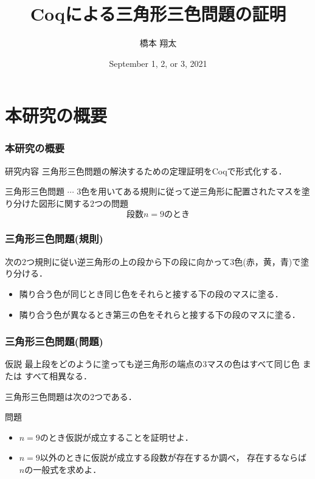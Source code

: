 \documentclass[dvipdfmx,cjk]{beamer}
\begin{document}
\title[Coqによる三角形三色問題の証明]{Coqによる三角形三色問題の証明} 
\author[Syota Hashimoto]{橋本 翔太}
\date{September 1, 2, or 3, 2021}

\begin{frame}
  \titlepage
\end{frame}

\begin{frame}
\tableofcontents
\end{frame}

\section{本研究の概要}

\begin{frame}
  \frametitle{本研究の概要}
  \begin{block}{研究内容}
    三角形三色問題の解決するための定理証明をCoqで形式化する．
  \end{block}

  \vspace{10pt}
  三角形三色問題 $\cdots$ $3$色を用いてある規則に従って逆三角形に配置されたマスを塗り分けた図形に関する$2$つの問題
  \[
  
  \text{段数}n=9\text{のとき}
  \]
\end{frame}

\begin{frame}
  \frametitle{三角形三色問題(規則)}
  次の$2$つ規則に従い逆三角形の上の段から下の段に向かって$3$色(赤，黄，青)で塗り分ける．

  \vspace{10pt}
  \begin{itemize}
  \item
    隣り合う色が同じとき同じ色をそれらと接する下の段のマスに塗る．
    \[
    
    \]
  \item
    隣り合う色が異なるとき第三の色をそれらと接する下の段のマスに塗る．
    \[
    
    \]
  \end{itemize}
\end{frame}

\begin{frame}
  \frametitle{三角形三色問題(問題)}
  \begin{block}{仮説}
    最上段をどのように塗っても逆三角形の端点の$3$マスの色はすべて同じ色 または すべて相異なる．
  \end{block}

  \vspace{10pt}
  三角形三色問題は次の$2$つである．
  \begin{block}{問題}
    \begin{itemize}
    \item
      $n=9$のとき仮説が成立することを証明せよ．
    \item
      $n=9$以外のときに仮説が成立する段数が存在するか調べ，
      存在するならば$n$の一般式を求めよ．
    \end{itemize}
  \end{block}
\end{frame}
\end{document}
